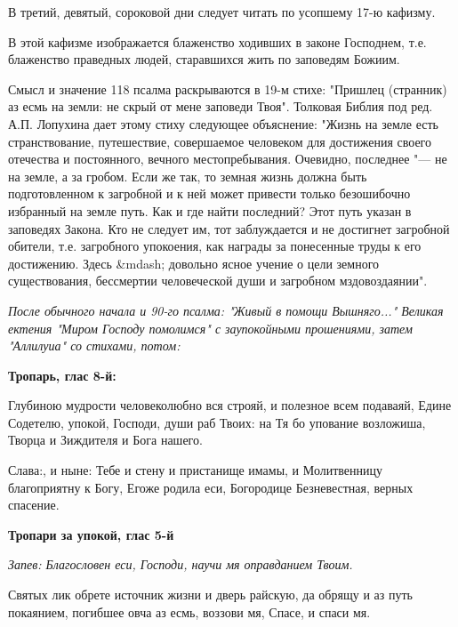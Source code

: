 В третий, девятый, сороковой дни следует читать по усопшему 17-ю кафизму. 

В этой кафизме изображается блаженство ходивших в законе Господнем, т.е. блаженство праведных людей, старавшихся жить по заповедям Божиим. 

Смысл и значение 118 псалма раскрываются в 19-м стихе: "Пришлец (странник) аз есмь на земли: не скрый от мене заповеди Твоя". Толковая Библия под ред. А.П. Лопухина дает этому стиху следующее объяснение: "Жизнь на земле есть странствование, путешествие, совершаемое человеком для достижения своего отечества и постоянного, вечного местопребывания. Очевидно, последнее "--- не на земле, а за гробом. Если же так, то земная жизнь должна быть подготовленном к загробной и к ней может привести только безошибочно избранный на земле путь. Как и где найти последний? Этот путь указан в заповедях Закона. Кто не следует им, тот заблуждается и не достигнет загробной обители, т.е. загробного упокоения, как награды за понесенные труды к его достижению. Здесь &mdash; довольно ясное учение о цели земного существования, бессмертии человеческой души и загробном мздовоздаянии". 

\normalfont{} 


\mychapterending

 


\itshape После обычного начала и 90-го псалма:\normalfont{} "Живый в помощи Вышняго..." \itshape Великая ектения\normalfont{} "Миром Господу помолимся" \itshape с заупокойными прошениями, затем\normalfont{} "Аллилуиа" \itshape со стихами, потом:\normalfont{}


\medskip


\bfseries Тропарь, глас 8-й:\normalfont{}


Глубиною мудрости человеколюбно вся строяй, и полезное всем подаваяй, Едине Содетелю, упокой, Господи, души раб Твоих: на Тя бо упование возложиша, Творца и Зиждителя и Бога нашего. 

Слава:, и ныне: Тебе и стену и пристанище имамы, и Молитвенницу благоприятну к Богу, Егоже родила еси, Богородице Безневестная, верных спасение.


\medskip


\bfseries Тропари за упокой, глас 5-й\normalfont{}


\itshape Запев:\normalfont{} Благословен еси, Господи, научи мя оправданием Твоим. 

Святых лик обрете источник жизни и дверь райскую, да обрящу и аз путь покаянием, погибшее овча аз есмь, воззови мя, Спасе, и спаси мя. 

